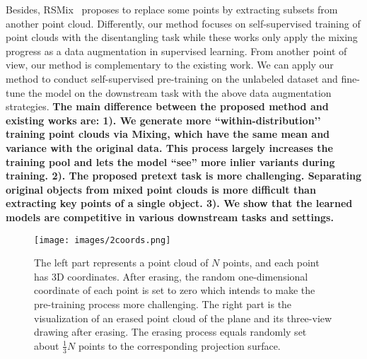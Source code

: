 \documentclass[journal]{IEEEtran}
\begin{document}
Besides, RSMix~\cite{lee2021regularization} proposes to replace some points by extracting subsets from another point cloud. 
Differently, our method focuses on self-supervised training of point clouds with the disentangling task while these works only apply the mixing progress as a data augmentation in supervised learning. 
From another point of view, our method is complementary to the existing work.
We can apply our method to conduct self-supervised pre-training on the unlabeled dataset and fine-tune the model on the downstream task with the above data augmentation strategies. 
\textbf{The main difference between the proposed method and existing works are: 1). We generate more ``within-distribution’’ training point clouds via Mixing, which have the same mean and variance with the original data. This process largely increases the training pool and lets the model ``see'' more inlier variants during training. 2). The proposed pretext task is more challenging. Separating original objects from mixed point clouds is more difficult than extracting key points of a single object. 3). We show that the learned models are competitive in various downstream tasks and settings.}


\begin{figure}[t]
\begin{center}
\texttt{[image: images/2coords.png]}
\end{center}
\vspace{-.15in}
   \caption{The left part represents a point cloud of $N$ points, and each point has 3D coordinates. After erasing, the random one-dimensional coordinate of each point is set to zero which intends to make the pre-training process more challenging. The right part is the visualization of an erased point cloud of the plane and its three-view drawing after erasing. The erasing process equals randomly set about $\frac{1}{3}N$ points to the corresponding projection surface.}
\label{fig:2coords}
\end{figure}
\end{document}
